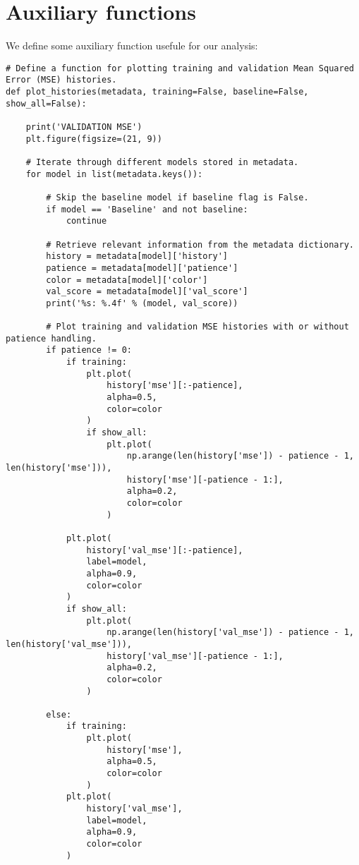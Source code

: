 \section{Auxiliary functions}

We define some auxiliary function usefule for our analysis: 
\begin{lstlisting}[style=Python]
# Define a function for plotting training and validation Mean Squared Error (MSE) histories.
def plot_histories(metadata, training=False, baseline=False, show_all=False):

    print('VALIDATION MSE')
    plt.figure(figsize=(21, 9))

    # Iterate through different models stored in metadata.
    for model in list(metadata.keys()):

        # Skip the baseline model if baseline flag is False.
        if model == 'Baseline' and not baseline:
            continue

        # Retrieve relevant information from the metadata dictionary.
        history = metadata[model]['history']
        patience = metadata[model]['patience']
        color = metadata[model]['color']
        val_score = metadata[model]['val_score']
        print('%s: %.4f' % (model, val_score))

        # Plot training and validation MSE histories with or without patience handling.
        if patience != 0:
            if training:
                plt.plot(
                    history['mse'][:-patience],
                    alpha=0.5,
                    color=color
                )
                if show_all:
                    plt.plot(
                        np.arange(len(history['mse']) - patience - 1, len(history['mse'])),
                        history['mse'][-patience - 1:],
                        alpha=0.2,
                        color=color
                    )

            plt.plot(
                history['val_mse'][:-patience],
                label=model,
                alpha=0.9,
                color=color
            )
            if show_all:
                plt.plot(
                    np.arange(len(history['val_mse']) - patience - 1, len(history['val_mse'])),
                    history['val_mse'][-patience - 1:],
                    alpha=0.2,
                    color=color
                )

        else:
            if training:
                plt.plot(
                    history['mse'],
                    alpha=0.5,
                    color=color
                )
            plt.plot(
                history['val_mse'],
                label=model,
                alpha=0.9,
                color=color
            )


\end{lstlisting}
